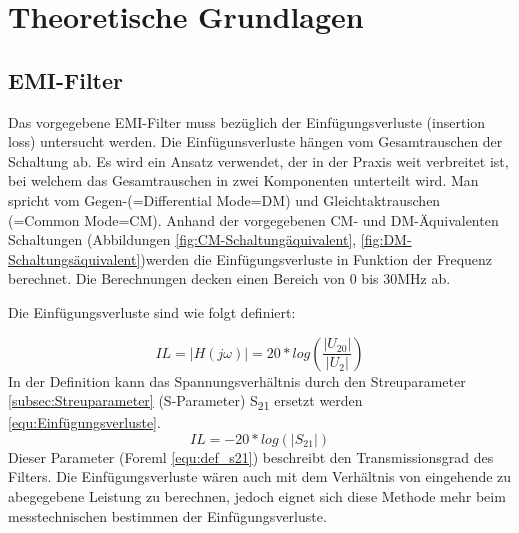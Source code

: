 \section{Theoretische Grundlagen} \label{sec:TheoretischeGrundlagen}

\subsection{EMI-Filter} \label{subsec:emifilter}
Das vorgegebene EMI-Filter muss bezüglich der Einfügungsverluste (insertion loss) untersucht werden. Die Einfügunsverluste hängen vom Gesamtrauschen der Schaltung ab. Es wird ein Ansatz verwendet, der in der Praxis weit verbreitet ist, bei welchem das Gesamtrauschen in zwei Komponenten unterteilt wird. Man spricht vom Gegen-(=Differential Mode=DM) und Gleichtaktrauschen (=Common Mode=CM). Anhand der vorgegebenen CM- und DM-Äquivalenten Schaltungen (Abbildungen \ref{fig:CM-Schaltungäquivalent}, \ref{fig:DM-Schaltungsäquivalent})werden die Einfügungsverluste in Funktion der Frequenz berechnet. Die Berechnungen decken einen Bereich von 0 bis 30MHz ab.

Die Einfügungsverluste sind wie folgt definiert: 

\begin{equation}\label{equ:Freqgang}
	IL = \left\lvert H(j\omega) \right\rvert = 20*log(\frac{ \left\lvert U_{20} \right\rvert }{ \left\lvert U_2 \right\rvert })
\end{equation}
In der Definition kann das Spannungsverhältnis durch den Streuparameter \ref{subsec:Streuparameter} (S-Parameter) S\textsubscript{21} ersetzt werden \ref{equ:Einfügungsverluste}.
\begin{equation}\label{equ:Einfügungsverluste}
	IL = -20*log (\left\lvert S_{21} \right\rvert)
\end{equation}
 Dieser Parameter (Foreml \ref{equ:def_s21}) beschreibt den Transmissionsgrad des Filters. Die Einfügungsverluste wären auch mit dem Verhältnis von eingehende zu abegegebene Leistung zu berechnen, jedoch eignet sich diese Methode mehr beim messtechnischen bestimmen der Einfügungsverluste. 
\newpage
